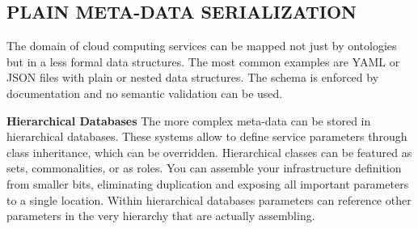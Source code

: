 \subsection{PLAIN META-DATA SERIALIZATION}

The domain of cloud computing services can be mapped not just by ontologies but in a less formal data structures. The most common examples are YAML or JSON files with plain or nested data structures. The schema is enforced by documentation and no semantic validation can be used.

\textbf{Hierarchical Databases}
The more complex meta-data can be stored in hierarchical databases. These systems  allow to define service parameters through class inheritance, which can be overridden. Hierarchical classes can be featured as sets, commonalities, or as roles. You can assemble your infrastructure definition from smaller bits, eliminating duplication and exposing all important parameters to a single location. Within hierarchical databases parameters can reference other parameters in the very hierarchy that are actually assembling.






